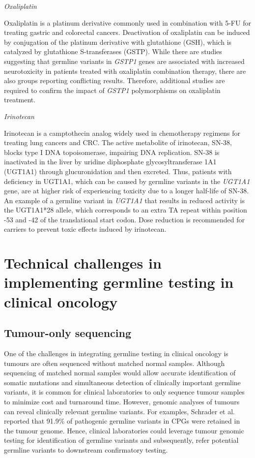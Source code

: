 \vspace{5mm}
\noindent\textit{Oxaliplatin}

Oxaliplatin is a platinum derivative commonly used in combination with 5-FU for treating gastric and colorectal cancers. Deactivation of oxaliplatin can be induced by conjugation of the platinum derivative with glutathione (GSH), which is catalyzed by glutathione S-transferases (GSTP). While there are studies suggesting that germline variants in \textit{GSTP1} genes are associated with increased neurotoxicity in patients treated with oxaliplatin combination therapy, there are also groups reporting conflicting results. Therefore, additional studies are required to confirm the impact of \textit{GSTP1} polymorphisms on oxaliplatin treatment.

\vspace{5mm}
\noindent\textit{Irinotecan}

Irinotecan is a camptothecin analog widely used in chemotherapy regimens for treating lung cancers and CRC. The active metabolite of irinotecan, SN-38, blocks type I DNA topoisomerase, impairing DNA replication. SN-38 is inactivated in the liver by uridine diphosphate glycosyltransferase 1A1 (UGT1A1) through glucuronidation and then excreted. Thus, patients with deficiency in UGT1A1, which can be caused by germline variants in the \textit{UGT1A1} gene, are at higher risk of experiencing toxicity due to a longer half-life of SN-38. An example of a germline variant in \textit{UGT1A1} that results in reduced activity is the UGT1A1*28 allele, which corresponds to an extra TA repeat within position -53 and -42 of the translational start codon. Dose reduction is recommended for carriers to prevent toxic effects induced by irinotecan.

\section{Technical challenges in implementing germline testing in clinical oncology}
\label{sec:Challengesinclinicalgermlinetesting}

\subsection{Tumour-only sequencing}

One of the challenges in integrating germline testing in clinical oncology is tumours are often sequenced without matched normal samples. Although sequencing of matched normal samples would allow accurate identification of somatic mutations and simultaneous detection of clinically important germline variants, it is common for clinical laboratories to only sequence tumour samples to minimize cost and turnaround time. However, genomic analyses of tumours can reveal clinically relevant germline variants. For examples, Schrader et al. \cite{Schrader2015} reported that 91.9\% of pathogenic germline variants in CPGs were retained in the tumour genome. Hence, clinical laboratories could leverage tumour genomic testing for identification of germline variants and subsequently, refer potential germline variants to downstream confirmatory testing.

